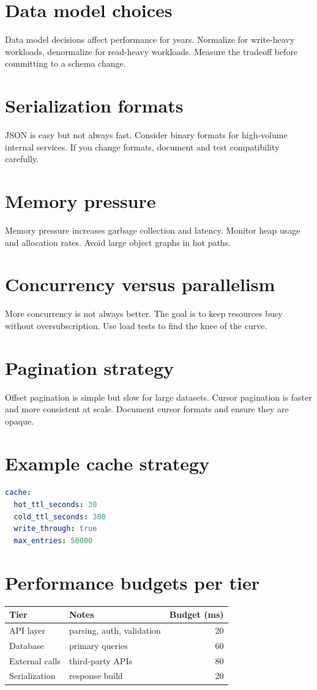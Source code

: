 \section{Data model choices}
Data model decisions affect performance for years.
Normalize for write-heavy workloads, denormalize for read-heavy workloads.
Measure the tradeoff before committing to a schema change.

\section{Serialization formats}
JSON is easy but not always fast.
Consider binary formats for high-volume internal services.
If you change formats, document and test compatibility carefully.

\section{Memory pressure}
Memory pressure increases garbage collection and latency.
Monitor heap usage and allocation rates.
Avoid large object graphs in hot paths.

\section{Concurrency versus parallelism}
More concurrency is not always better.
The goal is to keep resources busy without oversubscription.
Use load tests to find the knee of the curve.

\section{Pagination strategy}
Offset pagination is simple but slow for large datasets.
Cursor pagination is faster and more consistent at scale.
Document cursor formats and ensure they are opaque.

\section{Example cache strategy}
\begin{lstlisting}[language=YAML]
cache:
  hot_ttl_seconds: 30
  cold_ttl_seconds: 300
  write_through: true
  max_entries: 50000
\end{lstlisting}

\section{Performance budgets per tier}
\begin{tabularx}{\textwidth}{@{}lXr@{}}
\toprule
Tier & Notes & Budget (ms) \\
\midrule
API layer & parsing, auth, validation & 20 \\
Database & primary queries & 60 \\
External calls & third-party APIs & 80 \\
Serialization & response build & 20 \\
\bottomrule
\end{tabularx}

